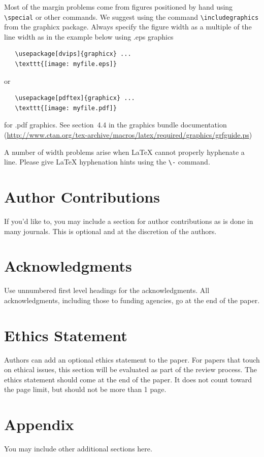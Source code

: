 \documentclass{article} %
\begin{document}
Most of the margin problems come from figures positioned by hand using
\verb+\special+ or other commands. We suggest using the command
\verb+\includegraphics+
from the graphicx package. Always specify the figure width as a multiple of
the line width as in the example below using .eps graphics
\begin{verbatim}
   \usepackage[dvips]{graphicx} ...
   \texttt{[image: myfile.eps]}
\end{verbatim}
or %
\begin{verbatim}
   \usepackage[pdftex]{graphicx} ...
   \texttt{[image: myfile.pdf]}
\end{verbatim}
for .pdf graphics.
See section~4.4 in the graphics bundle documentation (\url{http://www.ctan.org/tex-archive/macros/latex/required/graphics/grfguide.ps})

A number of width problems arise when LaTeX cannot properly hyphenate a
line. Please give LaTeX hyphenation hints using the \verb+\-+ command.

\section*{Author Contributions}
If you'd like to, you may include  a section for author contributions as is done
in many journals. This is optional and at the discretion of the authors.

\section*{Acknowledgments}
Use unnumbered first level headings for the acknowledgments. All
acknowledgments, including those to funding agencies, go at the end of the paper.

\section*{Ethics Statement}
Authors can add an optional ethics statement to the paper. 
For papers that touch on ethical issues, this section will be evaluated as part of the review process. The ethics statement should come at the end of the paper. It does not count toward the page limit, but should not be more than 1 page. 






\appendix
\section{Appendix}
You may include other additional sections here.
\end{document}
